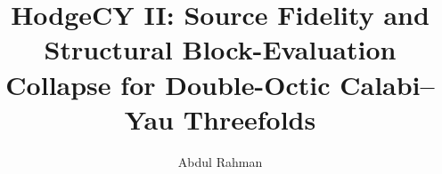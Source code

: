 \documentclass[11pt]{article}
\title{HodgeCY II: Source Fidelity and Structural Block-Evaluation Collapse for Double-Octic Calabi--Yau Threefolds}
\author{Abdul Rahman}
\date{}
\begin{document}
\maketitle

\begin{abstract}

\end{abstract}





\end{document}

